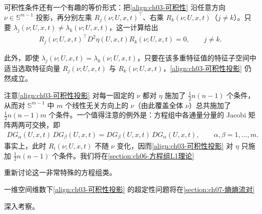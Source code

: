 \documentclass[../../main.tex]{subfiles}
\begin{document}
可积性条件还有一个有趣的等价形式：把\eqref{align:ch03-可积性} 沿任意方向 $\nu\in\mathbb{S}^{m-1}$ 投影，再分别左乘 $R_{j}(\nu;U,x,t)^{\top}$、右乘 $R_{k}(\nu;U,x,t)$（$j\neq k$）。只要 $\lambda_{j}(\nu;U,x,t)\neq\lambda_{k}(\nu;U,x,t)$，这一计算给出
\begin{align}
R_{j}(\nu;U,x,t)^{\top}D^{2}\eta(U,x,t)R_{k}(\nu;U,x,t)=0,\qquad j\neq k.
\label{align:ch03-可积性投影}
\end{align}

此外，即使 $\lambda_{j}(\nu;U,x,t)=\lambda_{k}(\nu;U,x,t)$，只要在该多重特征值的特征子空间中适当选取特征向量 $R_{j}(\nu;U,x,t)$ 与 $R_{k}(\nu;U,x,t)$，\eqref{align:ch03-可积性投影} 仍然成立。

注意\eqref{align:ch03-可积性投影} 对每一固定的 $\nu$ 都对 $\eta$ 施加了 $\frac{1}{2}n(n-1)$ 个条件，从而对 $\mathbb{S}^{m-1}$ 中 $m$ 个线性无关方向上的 $\nu$（由此覆盖全体 $\nu$）总共施加了 $\frac{1}{2}n(n-1)m$ 个条件。一个值得注意的例外是：方程组中各通量分量的 Jacobi 矩阵两两可交换，即
\begin{align}
DG_{\alpha}(U,x,t)\,DG_{\beta}(U,x,t)=DG_{\beta}(U,x,t)\,DG_{\alpha}(U,x,t),\qquad \alpha,\beta=1,\ldots,m.
\label{align:ch03-Jacobi可交换}
\end{align}
事实上，此时 $R_{i}(\nu;U,x,t)$ 不随 $\nu$ 变化，因而\eqref{align:ch03-可积性投影} 对 $\eta$ 只施加 $\frac{1}{2}n(n-1)$ 个条件。我们将在\cref{section:ch06-方程组L1理论}%

重新讨论这一非常特殊的方程组类。

一维空间维数下\eqref{align:ch03-可积性投影} 的超定性问题将在\cref{section:ch07-熵熵流对}%

深入考察。
\end{document}
